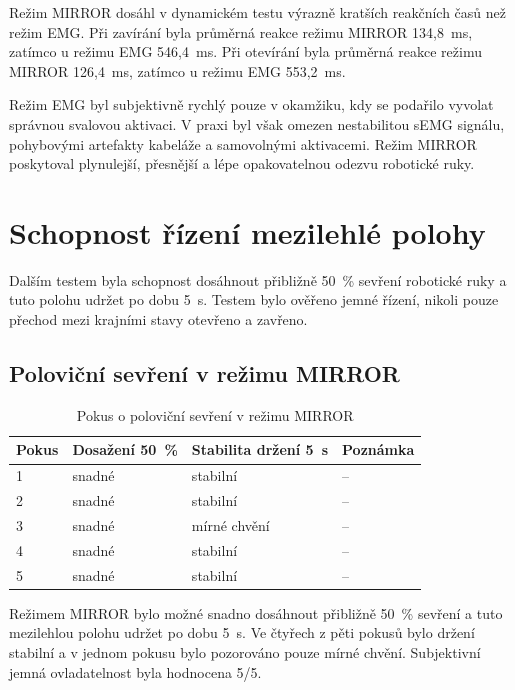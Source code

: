 Režim MIRROR dosáhl v dynamickém testu výrazně kratších reakčních časů než režim EMG\@. Při zavírání byla průměrná reakce režimu MIRROR 134{,}8~ms, zatímco u režimu EMG 546{,}4~ms. Při otevírání byla průměrná reakce režimu MIRROR 126{,}4~ms, zatímco u režimu EMG 553{,}2~ms.

Režim EMG byl subjektivně rychlý pouze v okamžiku, kdy se podařilo vyvolat správnou svalovou aktivaci. V praxi byl však omezen nestabilitou sEMG signálu, pohybovými artefakty kabeláže a samovolnými aktivacemi. Režim MIRROR poskytoval plynulejší, přesnější a lépe opakovatelnou odezvu robotické ruky.

\section{Schopnost řízení mezilehlé polohy}
\label{sec:mezilehla-poloha}

Dalším testem byla schopnost dosáhnout přibližně 50~\% sevření robotické ruky a tuto polohu udržet po dobu 5~s. Testem bylo ověřeno jemné řízení, nikoli pouze přechod mezi krajními stavy otevřeno a zavřeno.

\subsection{Poloviční sevření v režimu MIRROR}
\label{subsec:polovicni-mirror}

\begin{table}[htbp]
\centering
\caption{Pokus o poloviční sevření v režimu MIRROR}
\label{tab:mirror-polovicni-sevreni}
\setlength{\tabcolsep}{2pt}
\begin{tabular}{|p{}|p{}|p{}|p{}|}
\hline
\textbf{Pokus} & \textbf{Dosažení 50~\%} & \textbf{Stabilita držení 5~s} & \textbf{Poznámka} \\
\hline
1 & snadné & stabilní & -- \\
\hline
2 & snadné & stabilní & -- \\
\hline
3 & snadné & mírné chvění & -- \\
\hline
4 & snadné & stabilní & -- \\
\hline
5 & snadné & stabilní & -- \\
\hline
\end{tabular}
\end{table}

Režimem MIRROR bylo možné snadno dosáhnout přibližně 50~\% sevření a tuto mezilehlou polohu udržet po dobu 5~s. Ve čtyřech z pěti pokusů bylo držení stabilní a v jednom pokusu bylo pozorováno pouze mírné chvění. Subjektivní jemná ovladatelnost byla hodnocena 5/5.

